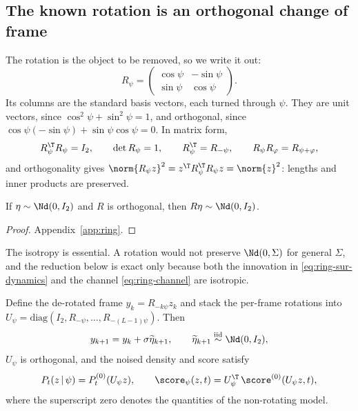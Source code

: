 \subsection{The known rotation is an orthogonal change of frame}

The rotation is the object to be removed, so we write it out:
\begin{equation}
  R_\psi =
  \begin{pmatrix} \cos\psi & -\sin\psi \\ \sin\psi & \cos\psi \end{pmatrix} .
  \label{eq:ring-rotation}
\end{equation}
Its columns are the standard basis vectors, each turned through $\psi$. They
are unit vectors, since $\cos^2\psi + \sin^2\psi = 1$, and orthogonal, since
$\cos\psi(-\sin\psi) + \sin\psi\cos\psi = 0$. In matrix form,
\begin{equation}
  R_\psi^{\T} R_\psi = I_2, \qquad \det R_\psi = 1, \qquad
  R_\psi^{\T} = R_{-\psi}, \qquad R_\psi R_\varphi = R_{\psi+\varphi} ,
  \label{eq:ring-rot-props}
\end{equation}
and orthogonality gives
$\norm{R_\psi z}^2 = z^{\T} R_\psi^{\T} R_\psi z = \norm{z}^2$: lengths and
inner products are preserved.

\begin{lemma}
\label{lem:ring-isotropy}
If $\eta \sim \Nd(0, I_2)$ and $R$ is orthogonal, then $R\eta \sim \Nd(0,I_2)$.
\end{lemma}

\begin{proof}
Appendix~\ref{app:ring}.
\end{proof}

The isotropy is essential. A rotation would not preserve $\Nd(0,\Sigma)$ for
general $\Sigma$, and the reduction below is exact only because both the
innovation in \eqref{eq:ring-sur-dynamics} and the channel
\eqref{eq:ring-channel} are isotropic.

\begin{lemma}\label{lem:ring-gauge}
Define the de-rotated frame $y_k = R_{-k\psi} z_k$ and stack the per-frame
rotations into
$U_\psi = \mathrm{diag}(I_2, R_{-\psi}, \dots, R_{-(L-1)\psi})$. Then
\begin{equation}
  y_{k+1} = y_k + \sigma \widetilde\eta_{k+1} ,
  \qquad \widetilde\eta_{k+1} \stackrel{\text{iid}}{\sim} \Nd(0, I_2) ,
  \label{eq:ring-gauged-rw}
\end{equation}
$U_\psi$ is orthogonal, and the noised density and score satisfy
\begin{equation}
  P_t(z \,|\, \psi) = P^{(0)}_t(U_\psi z) ,
  \qquad
  \score_\psi(z,t) = U_\psi^{\T}\, \score^{(0)}(U_\psi z, t) ,
  \label{eq:ring-gauge-score}
\end{equation}
where the superscript zero denotes the quantities of the non-rotating model.
\end{lemma}

